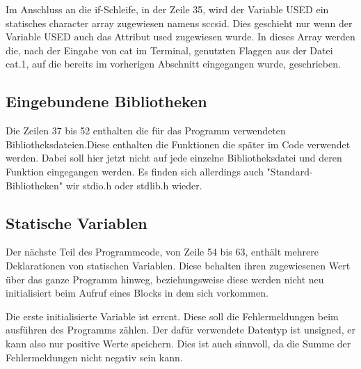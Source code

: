 Im Anschluss an die if-Schleife, in der Zeile 35, wird der Variable USED ein statisches character array zugewiesen namens sccsid. Dies geschieht nur wenn der Variable USED auch das Attribut used zugewiesen wurde. In dieses Array werden die, nach der Eingabe von cat im Terminal, genutzten Flaggen aus der Datei cat.1, auf die bereits im vorherigen Abschnitt eingegangen wurde, geschrieben.

\subsection{Eingebundene Bibliotheken}
Die Zeilen 37 bis 52 enthalten die für das Programm verwendeten Bibliotheksdateien.Diese enthalten die Funktionen die später im Code verwendet werden. Dabei soll hier jetzt nicht auf jede einzelne Bibliotheksdatei und deren Funktion eingegangen werden. Es finden sich allerdings auch "Standard-Bibliotheken" wir stdio.h oder stdlib.h wieder.

\subsection{Statische Variablen}
Der nächste Teil des Programmcode, von Zeile 54 bis 63, enthält mehrere Deklarationen von statischen Variablen. Diese behalten ihren zugewiesenen Wert über das ganze Programm hinweg, beziehungsweise diese  werden nicht neu initialisiert beim Aufruf eines Blocks in dem sich vorkommen. \par
Die erste initialisierte Variable ist errcnt. Diese soll die Fehlermeldungen beim ausführen des Programms zählen. Der dafür verwendete Datentyp ist unsigned, er kann also nur positive Werte speichern. Dies ist auch sinnvoll, da die Summe der Fehlermeldungen nicht negativ sein kann. \par

